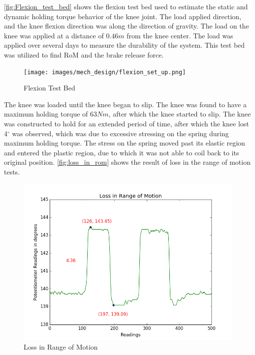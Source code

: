 \autoref{fig:Flexion_test_bed} shows the flexion test bed used to estimate the static and dynamic holding torque behavior of the knee joint. The load applied direction, and the knee flexion direction was along the direction of gravity. The load on the knee was applied at a distance of $0.46m$ from the knee center. The load was applied over several days to measure the durability of the system. This test bed was utilized to find RoM and the brake release force.



\begin{figure}[h]
    \centering
    \texttt{[image: images/mech\_design/flexion\_set\_up.png]}
    \caption[Flexion Test Bed]{Flexion Test Bed}
    \label{fig:Flexion_test_bed}
\end{figure}

The knee was loaded until the knee began to slip. The knee was found to have a maximum holding torque of $63Nm$, after which the knee started to slip. The knee was constructed to hold for an extended period of time, after which the knee lost 4$^{\circ}$ was observed, which was due to excessive stressing on the spring during maximum holding torque. The stress on the spring moved past its elastic region and entered the plastic region, due to which it was not able to coil back to its original position. \autoref{fig:loss_in_rom} shows the result of loss in the range of motion tests.
\begin{figure}[h!]
    \centering
    \includegraphics[scale=0.5]{ images/mech_design/loss_in_rom.png}
    \caption{Loss in Range of Motion}
    \label{fig:loss_in_rom}

\end{figure}

